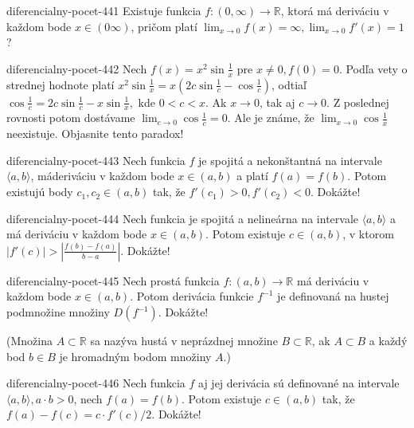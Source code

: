 \begin{defproblem}{diferencialny-pocet-441}
Existuje funkcia $f:(0,\infty)\rightarrow\mathbb{R}$, ktorá má deriváciu v každom bode $x\in (0\infty)$, pričom platí $\lim_{x\rightarrow 0}f(x)=\infty,\lim_{x\rightarrow 0}f'(x)=1$?
\end{defproblem}

\begin{defproblem}{diferencialny-pocet-442}
Nech $f(x)=x^2\sin \frac{1}{x}$ pre $x\neq 0,f(0)=0$. Podľa vety o strednej hodnote platí $x^2\sin \frac{1}{x}=x(2c\sin \frac{1}{c}-\cos \frac{1}{c})$, odtiaľ $\cos \frac{1}{c}=2c\sin \frac{1}{c}-x\sin \frac{1}{x},$ kde $0<c<x$. Ak $x\rightarrow 0$, tak aj $c\rightarrow 0$. Z poslednej rovnosti potom dostávame $\lim_{c\rightarrow 0}\cos \frac{1}{c}=0$. Ale je známe, že $\lim_{x\rightarrow 0}\cos \frac{1}{x}$ neexistuje. Objasnite tento paradox!
\end{defproblem}

\begin{defproblem}{diferencialny-pocet-443}
Nech funkcia $f$ je spojitá a nekonštantná na intervale $\langle a,b \rangle$, máderiváciu v každom bode $x\in (a,b)$ a platí $f(a)=f(b)$. Potom existujú body $c_1,c_2\in (a,b)$ tak, že $f'(c_1)>0,f'(c_2)<0$. Dokážte!
\end{defproblem}

\begin{defproblem}{diferencialny-pocet-444}
Nech funkcia je spojitá a nelineárna na intervale $\langle a,b \rangle$ a má deriváciu v každom bode $x\in (a,b)$. Potom existuje $c\in (a,b)$, v ktorom $|f'(c)|>|\frac{f(b)-f(a)}{b-a}|$. Dokážte!
\end{defproblem}

\begin{defproblem}{diferencialny-pocet-445}
Nech prostá funkcia $f:(a,b)\rightarrow\mathbb{R}$ má deriváciu v každom bode $x\in (a,b)$. Potom derivácia funkcie $f^{-1}$ je definovaná na hustej podmnožine množiny $D(f^{-1})$. Dokážte!

(Množina $A\subset\mathbb{R}$ sa nazýva hustá v neprázdnej množine $B\subset\mathbb{R}$, ak $A\subset B$ a každý bod $b\in B$ je hromadným bodom množiny $A$.)
\end{defproblem}

\begin{defproblem}{diferencialny-pocet-446}
Nech funkcia $f$ aj jej derivácia sú definované na intervale $\langle a,b \rangle,a\cdot b>0$, nech $f(a)=f(b)$. Potom existuje $c\in (a,b)$ tak, že $f(a)-f(c)=c\cdot f'(c)/2$. Dokážte!
\end{defproblem}

